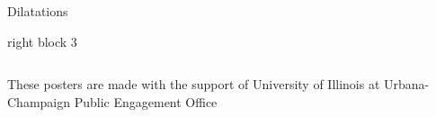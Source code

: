 \documentclass[leqno,presentation]{beamer}
\begin{document}
\begin{frame}
\begin{columns}[t]
\begin{column}{.25\linewidth}
\begin{block}{Dilatations}

\end{block}

\begin{block}{right block 3}

\end{block}

\end{column}

\end{columns}
  \begin{block}{}
   \begin{center}
   These posters are made with the support of University of Illinois at Urbana-Champaign Public Engagement Office
  \end{center}
  \end{block}



\end{frame}
\end{document}
